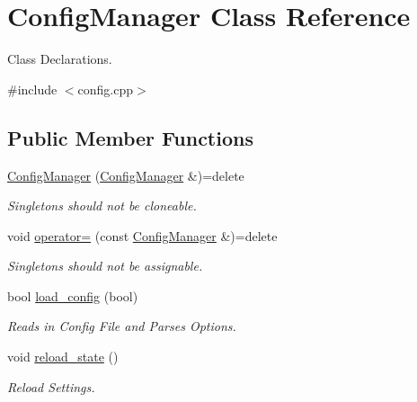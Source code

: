 \hypertarget{classConfigManager}{}\section{Config\+Manager Class Reference}
\label{classConfigManager}


Class Declarations.  




{\ttfamily \#include $<$config.\+cpp$>$}

\subsection*{Public Member Functions}
\begin{DoxyCompactItemize}
\item 
\mbox{\label{classConfigManager_a57ec58031b3b5caa0ce9f1833c45b2a1}} 
\mbox{\hyperlink{classConfigManager_a57ec58031b3b5caa0ce9f1833c45b2a1}{Config\+Manager}} (\mbox{\hyperlink{classConfigManager}{Config\+Manager}} \&)=delete
\begin{DoxyCompactList}\small\item\em Singletons should not be cloneable. \end{DoxyCompactList}\item 
\mbox{\label{classConfigManager_a09a5d07060b4433a1b628ede8a49235d}} 
void \mbox{\hyperlink{classConfigManager_a09a5d07060b4433a1b628ede8a49235d}{operator=}} (const \mbox{\hyperlink{classConfigManager}{Config\+Manager}} \&)=delete
\begin{DoxyCompactList}\small\item\em Singletons should not be assignable. \end{DoxyCompactList}\item 
bool \mbox{\hyperlink{classConfigManager_a15a06af24f82a421d287501d3c28ec53}{load\+\_\+config}} (bool)
\begin{DoxyCompactList}\small\item\em Reads in Config File and Parses Options. \end{DoxyCompactList}\item 
void \mbox{\hyperlink{classConfigManager_ad9571dcb459dc4e5f8da36106de0be8a}{reload\+\_\+state}} ()
\begin{DoxyCompactList}\small\item\em Reload Settings. \end{DoxyCompactList}\item 

\end{DoxyCompactItemize}
